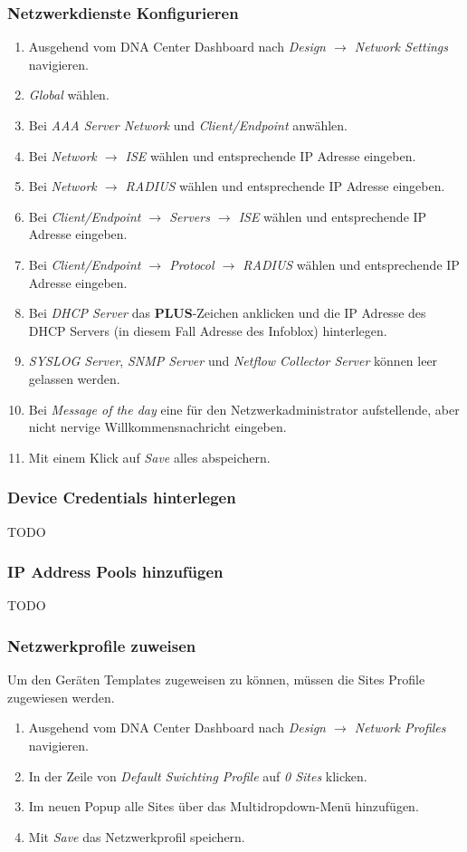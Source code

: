 \subsubsection{Netzwerkdienste Konfigurieren}
\begin{enumerate}
	\item Ausgehend vom DNA Center Dashboard nach \textit{Design $\rightarrow$ Network Settings} navigieren. 
	\item \textit{Global} wählen. 
	\item Bei \textit{AAA Server Network} und \textit{Client/Endpoint} anwählen.
	\item Bei \textit{Network $\rightarrow$ ISE} wählen und entsprechende IP Adresse eingeben.
	\item Bei \textit{Network $\rightarrow$ RADIUS} wählen und entsprechende IP Adresse eingeben.
	\item Bei \textit{Client/Endpoint $\rightarrow$ Servers $\rightarrow$ ISE} wählen und entsprechende IP Adresse eingeben.
	\item Bei \textit{Client/Endpoint $\rightarrow$ Protocol $\rightarrow$ RADIUS} wählen und entsprechende IP Adresse eingeben.
	\item Bei \textit{DHCP Server} das \textbf{PLUS}-Zeichen anklicken und die IP Adresse des DHCP Servers (in diesem Fall Adresse des Infoblox) hinterlegen. 
	\item \textit{SYSLOG Server}, \textit{SNMP Server} und \textit{Netflow Collector Server} können leer gelassen werden.
	\item Bei \textit{Message of the day} eine für den Netzwerkadministrator aufstellende, aber nicht nervige Willkommensnachricht eingeben. 
	\item Mit einem Klick auf \textit{Save} alles abspeichern.
\end{enumerate}

\subsubsection{Device Credentials hinterlegen}
TODO

\subsubsection{IP Address Pools hinzufügen}
TODO

\subsubsection{Netzwerkprofile zuweisen}
Um den Geräten Templates zugeweisen zu können, müssen die Sites Profile zugewiesen werden.
\begin{enumerate}
	\item Ausgehend vom DNA Center Dashboard nach \textit{Design $\rightarrow$ Network Profiles} navigieren. 
	\item In der Zeile von \textit{Default Swichting Profile} auf \textit{0 Sites} klicken. 
	\item Im neuen Popup alle Sites über das Multidropdown-Menü hinzufügen.
	\item Mit \textit{Save} das Netzwerkprofil speichern.
\end{enumerate}

